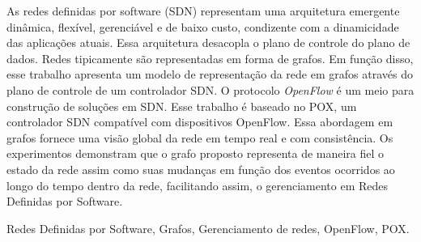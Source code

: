 \begin{resumo}
\label{sec:resumo}
As redes definidas por software (SDN) representam 
uma arquitetura emergente dinâmica, 
flexível, gerenciável e de baixo custo,
condizente com a dinamicidade das aplicações atuais. 
Essa arquitetura desacopla o plano de controle do plano de dados. 
Redes tipicamente são representadas em forma de grafos.
Em função disso, esse trabalho apresenta
um modelo de representação da rede em grafos através do 
plano de controle de um controlador SDN. 
O protocolo \emph{OpenFlow} é um meio para construção de soluções em SDN.
Esse trabalho é baseado no POX, um controlador SDN compatível 
com dispositivos OpenFlow.
Essa abordagem em grafos fornece uma visão global da rede em tempo 
real e com consistência.
Os experimentos demonstram que o grafo proposto representa de 
maneira fiel o estado da rede assim como suas mudanças em função 
dos eventos ocorridos ao longo do tempo dentro da rede, 
facilitando assim, o gerenciamento em Redes Definidas por Software.

\smallskip
{} Redes Definidas por Software, Grafos, 
Gerenciamento de redes, OpenFlow, POX.
\end{resumo}